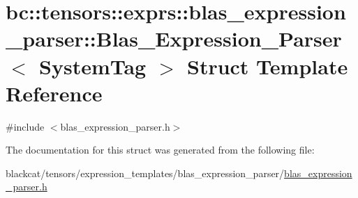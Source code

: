 \hypertarget{structbc_1_1tensors_1_1exprs_1_1blas__expression__parser_1_1Blas__Expression__Parser}{}\section{bc\+:\+:tensors\+:\+:exprs\+:\+:blas\+\_\+expression\+\_\+parser\+:\+:Blas\+\_\+\+Expression\+\_\+\+Parser$<$ System\+Tag $>$ Struct Template Reference}
\label{structbc_1_1tensors_1_1exprs_1_1blas__expression__parser_1_1Blas__Expression__Parser}


{\ttfamily \#include $<$blas\+\_\+expression\+\_\+parser.\+h$>$}



The documentation for this struct was generated from the following file\+:\begin{DoxyCompactItemize}
\item 
blackcat/tensors/expression\+\_\+templates/blas\+\_\+expression\+\_\+parser/\hyperlink{blas__expression__parser_8h}{blas\+\_\+expression\+\_\+parser.\+h}\end{DoxyCompactItemize}
